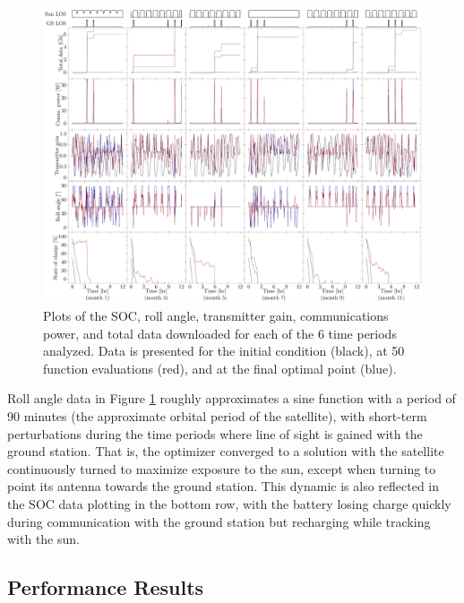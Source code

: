 \documentclass[]{aiaa-tc} %
\begin{document}
        \begin{figure}[!htb]
          \centering
          \includegraphics[width=\textwidth]{images/cadre_data}
          \caption[width=0.4\textwidth]{Plots of the SOC, roll angle, transmitter gain, communications power, and total data downloaded for 
          each of the 6 time periods analyzed. Data is presented for the initial condition (black), at 50 function evaluations (red), and at the final 
          optimal point (blue). 
          \label{cadre_data_results}
          }
        \end{figure}


        Roll angle data in Figure \ref{cadre_data_results} roughly approximates a sine function
        with a period of 90 minutes (the approximate orbital period of the satellite), with short-term perturbations during the time
        periods where line of sight is gained with the ground station. That is, the optimizer
        converged to a solution with the satellite continuously turned to maximize exposure to the sun,
        except when turning to point its antenna towards the ground station. This dynamic is also reflected in the SOC
        data plotting in the bottom row, with the battery losing charge quickly during
        communication with the ground station but recharging while tracking with the sun.



        \clearpage
        

        \subsection{Performance Results}
\end{document}
